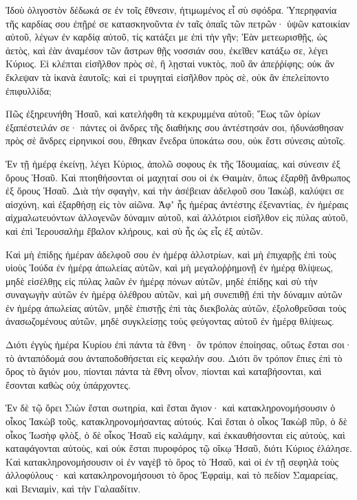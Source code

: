 \begin{spacing}{1.1}
\begin{multicols}{2}
Ἰδοὺ ὀλιγοστὸν δέδωκά σε ἐν τοῖς ἔθνεσιν, ἠτιμωμένος εἶ σὺ σφόδρα.
Ὑπερηφανία τῆς καρδίας σου ἐπῇρέ σε κατασκηνοῦντα ἐν ταῖς ὀπαῖς τῶν πετρῶν· ὑψῶν κατοικίαν αὐτοῦ, λέγων ἐν καρδίᾳ αὐτοῦ, τίς κατάξει με ἐπὶ τὴν γῆν;
Ἐὰν μετεωρισθῇς, ὡς ἀετὸς, καὶ ἐὰν ἀναμέσον τῶν ἄστρων θῇς νοσσιάν σου, ἐκεῖθεν κατάξω σε, λέγει Κύριος.
Εἰ κλέπται εἰσῆλθον πρὸς σὲ, ἢ λῃσταὶ νυκτὸς, ποῦ ἂν ἀπεῤῥίφης; οὐκ ἂν ἔκλεψαν τὰ ἱκανὰ ἑαυτοῖς; καὶ εἰ τρυγηταὶ εἰσῆλθον πρὸς σὲ, οὐκ ἂν ἐπελείποντο ἐπιφυλλίδα;

Πῶς ἐξηρευνήθη Ἡσαῦ, καὶ κατελήφθη τὰ κεκρυμμένα αὐτοῦ;
Ἕως τῶν ὁρίων ἐξαπέστειλάν σε· πάντες οἱ ἄνδρες τῆς διαθήκης σου ἀντέστησάν σοι, ἠδυνάσθησαν πρὸς σὲ ἄνδρες εἰρηνικοί σου, ἔθηκαν ἔνεδρα ὑποκάτω σου, οὐκ ἔστι σύνεσις αὐτοῖς.

Ἐν τῇ ἡμέρᾳ ἐκείνῃ, λέγει Κύριος, ἀπολῶ σοφους ἐκ τῆς Ἰδουμαίας, καὶ σύνεσιν ἐξ ὄρους Ἡσαῦ.
Καὶ πτοηθήσονται οἱ μαχηταί σου οἱ ἐκ Θαιμὰν, ὅπως ἐξαρθῇ ἄνθρωπος ἐξ ὄρους Ἡσαῦ.
Διὰ τὴν σφαγὴν, καὶ τὴν ἀσέβειαν ἀδελφοῦ σου Ἰακὼβ, καλύψει σε αἰσχύνη, καὶ ἐξαρθήσῃ εἰς τὸν αἰῶνα.
Ἀφʼ ἧς ἡμέρας ἀντέστης ἐξεναντίας, ἐν ἡμέραις αἰχμαλωτευόντων ἀλλογενῶν δύναμιν αὐτοῦ, καὶ ἀλλότριοι εἰσῆλθον εἰς πύλας αὐτοῦ, καὶ ἐπὶ Ἱερουσαλὴμ ἔβαλον κλήρους, καὶ σὺ ἦς ὡς εἷς ἐξ αὐτῶν.

Καὶ μὴ ἐπίδῃς ἡμέραν ἀδελφοῦ σου ἐν ἡμέρᾳ ἀλλοτρίων, καὶ μὴ ἐπιχαρῇς ἐπὶ τοὺς υἱοὺς Ἰούδα ἐν ἡμέρᾳ ἀπωλείας αὐτῶν, καὶ μὴ μεγαλοῤῥημονῇ ἐν ἡμέρᾳ θλίψεως,
μηδὲ εἰσέλθῃς εἰς πύλας λαῶν ἐν ἡμέρᾳ πόνων αὐτῶν, μηδὲ ἐπίδῃς καὶ σὺ τὴν συναγωγὴν αὐτῶν ἐν ἡμέρᾳ ὀλέθρου αὐτῶν, καὶ μὴ συνεπιθῇ ἐπὶ τὴν δύναμιν αὐτῶν ἐν ἡμέρᾳ ἀπωλείας αὐτῶν,
μηδὲ ἐπιστῇς ἐπὶ τὰς διεκβολὰς αὐτῶν, ἐξολοθρεῦσαι τοὺς ἀνασωζομένους αὐτῶν, μηδὲ συγκλείσῃς τοὺς φεύγοντας αὐτοῦ ἐν ἡμέρᾳ θλίψεως.

Διότι ἐγγὺς ἡμέρα Κυρίου ἐπὶ πάντα τὰ ἔθνη· ὃν τρόπον ἐποίησας, οὕτως ἔσται σοι· τὸ ἀνταπόδομά σου ἀνταποδοθήσεται εἰς κεφαλήν σου.
Διότι ὃν τρόπον ἔπιες ἐπὶ τὸ ὄρος τὸ ἅγιόν μου, πίονται πάντα τὰ ἔθνη οἶνον, πίονται καὶ καταβήσονται, καὶ ἔσονται καθὼς οὐχ ὑπάρχοντες.

Ἑν δὲ τῷ ὄρει Σιὼν ἔσται σωτηρία, καὶ ἔσται ἅγιον· καὶ κατακληρονομήσουσιν ὁ οἶκος Ἰακὼβ τοῦς, κατακληρονομήσαντας αὐτούς.
Καὶ ἔσται ὁ οἶκος Ἰακὼβ πῦρ, ὁ δὲ οἶκος Ἰωσὴφ φλὸξ, ὁ δὲ οἶκος Ἡσαῦ εἰς καλάμην, καὶ ἐκκαυθήσονται εἰς αὐτοὺς, καὶ καταφάγονται αὐτοὺς, καὶ οὐκ ἔσται πυροφόρος τῷ οἴκῳ Ἡσαῦ, διότι Κύριος ἐλάλησε.
Καὶ κατακληρονομήσουσιν οἱ ἐν ναγὲβ τὸ ὄρος τὸ Ἡσαῦ, καὶ οἱ ἐν τῇ σεφηλὰ τοὺς ἀλλοφύλους· καὶ κατακληρονομήσουσι τὸ ὄρος Ἐφραὶμ, καὶ τὸ πεδίον Σαμαρείας, καὶ Βενιαμὶν, καὶ τὴν Γαλααδίτιν.


\end{multicols}
\end{spacing}
